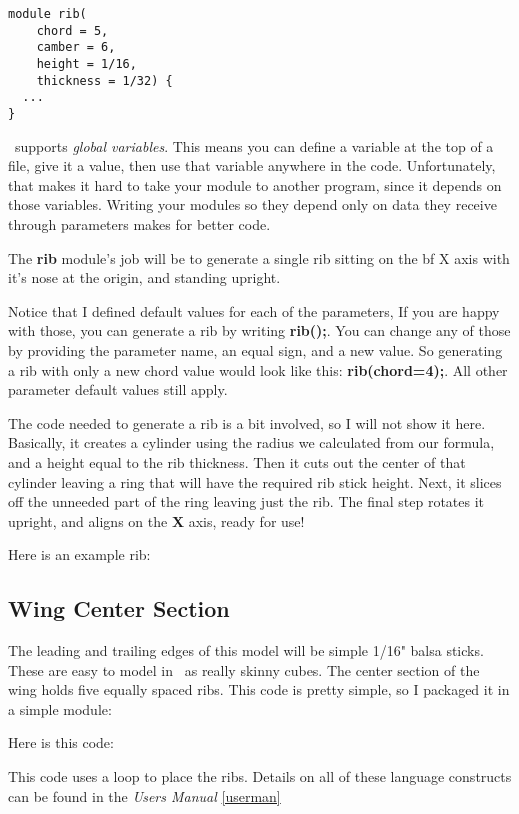 \begin{lstlisting}
module rib(
    chord = 5,
    camber = 6,
    height = 1/16,
    thickness = 1/32) {
  ...
}
\end{lstlisting}

\osc\ supports {\it global variables}. This means you
can define a variable at the top of a file,  give it a value, then use
that variable anywhere in the code. Unfortunately, that makes it hard to take
your module to another program, since it depends on those variables. Writing
your modules so they depend only on data they receive through parameters makes
for better code.

The {\bf rib} module's job will be to generate a single rib sitting on the {bf X} axis
with it's nose at the origin, and standing upright.

Notice that I defined  default values for each of the parameters, If you are
happy with those, you can generate a rib by writing {\bf rib();}. You can
change any of those by providing the parameter name, an equal sign, and a new
value. So generating a rib with only a new chord value would look like this:
{\bf rib(chord=4);}. All other parameter default values still apply.

The code needed to generate a rib is a bit involved, so I will not show it
here. Basically, it creates a cylinder using the radius we calculated from our
formula, and a height equal to the rib thickness.  Then it cuts out the center
of that cylinder leaving a ring that will have the required rib stick height.
Next, it slices off the unneeded part of the ring leaving just the rib. The
final step rotates it upright, and aligns on the {\bf X} axis, ready for use!

Here is an example rib:


\subsection{Wing Center Section}

The leading and trailing edges of this model will be simple 1/16" balsa sticks.
These are easy to model in \osc\ as really skinny cubes. The center section
of the wing holds five equally spaced ribs. This code is pretty simple, so I
packaged it in a simple module:

Here is this code:



This code uses a loop to place the ribs. Details on all of these language
constructs can be found in the {\it Users Manual} \ref{userman}

